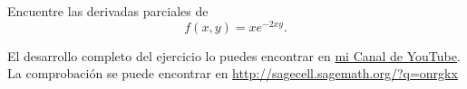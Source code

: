 %
%
%



\begin{resuelto}
	Encuentre las derivadas parciales de
	$$
	f(x,y)=xe^{-2xy}.
	$$
\end{resuelto}

El desarrollo completo del ejercicio lo puedes encontrar en \href{https://www.youtube.com/watch?v=2_wPr3Qnyd8&list=PLblwZNylw7eHCfUFZF-cc-kLIR-wzwWNi&index=8}{mi Canal de YouTube}. La comprobaci\'on se puede encontrar en \href{http://sagecell.sagemath.org/?z=eJwrSyzSUK_QqVTX5OVK06jQUajUVLBVqNBKrSjQ0DXSqtCqBElUAGUqNW0V0vRSMtOAykBilWAxBbggSGFxRn65RloFnFWpCQD8XBsP&lang=sage}{http://sagecell.sagemath.org/?q=onrgkx}


%
%
%
%
%
%


